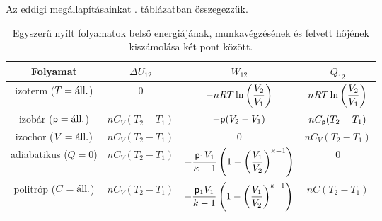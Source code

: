 Az eddigi megállapításainkat . táblázatban összegezzük.
\begin{table}[htb]
\centering
\begin{tabular}{|c|c|c|c|} \hline
Folyamat & $\Delta U_{12}$ & $W_{12}$ & $Q_{12}$\\ \hline\hline
izoterm ($T=\textnormal{áll.}$) & 0 & $-nRT\ln\left({\dfrac{V_2}{V_1}}\right)$ & $nRT\ln\left({\dfrac{V_2}{V_1}}\right)$\\ \hline
izobár ($\mathsf p=\textnormal{áll.}$) & $nC_V(T_2-T_1)$ & $-\mathsf p(V_2-V_1)$ & $nC_\mathsf p(T_2-T_1)$ \\ \hline
izochor ($V=\textnormal{áll.}$) & $nC_V(T_2-T_1)$ & 0 & $nC_V(T_2-T_1)$\\ \hline
adiabatikus ($Q=0$) & $nC_V(T_2-T_1)$ & $- \dfrac{\mathsf p_1V_1}{\kappa-1}\left({1-\left({\dfrac{V_1}{V_2}}\right)^{\kappa-1}}\right)$ & 0\\ \hline
politróp ($C=\textnormal{áll.}$) & $nC_V(T_2-T_1)$ & $- \dfrac{\mathsf p_1V_1}{k-1}\left({1-\left({\dfrac{V_1}{V_2}}\right)^{k-1}}\right)$ & $nC(T_2-T_1)$\\ \hline
\end{tabular}
\caption{Egyszerű nyílt folyamatok belső energiájának, munkavégzésének és felvett hőjének kiszámolása két pont között.}
\label{tab:nyilt_foly}
\end{table}
